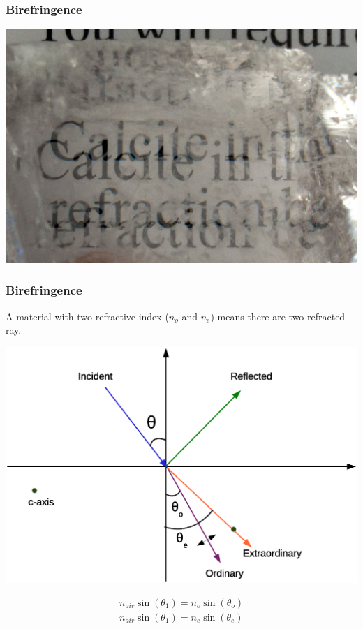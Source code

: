 \documentclass{beamer}
\begin{document}
\begin{frame}
\frametitle{Birefringence}
\begin{center}
\includegraphics[scale=0.6]{calcite_birefringence.jpg}
\end{center}
\end{frame}
\begin{frame}
\frametitle{Birefringence}
A material with two refractive index ($n_o$ and $n_e$) means there are two refracted ray.
\begin{center}
\includegraphics[scale=0.3]{incident_birefreingence.eps}
\end{center}
\begin{eqnarray}
n_{air}\sin(\theta_1) = n_{o}\sin(\theta_o) \\ \nonumber
n_{air}\sin(\theta_1) = n_{e}\sin(\theta_e) \nonumber
\end{eqnarray}
\end{frame}
\end{document}

